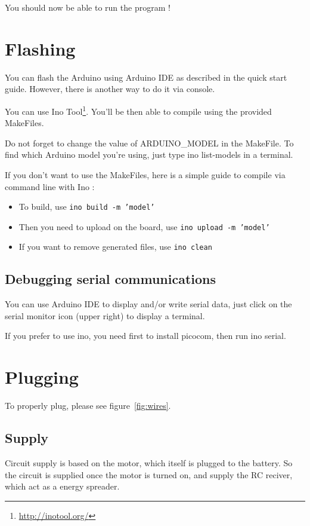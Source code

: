 \documentclass[a4paper,11pt]{report}
\begin{document}
You should now be able to run the program !

\section{Flashing}
\label{sec:Flashing} %

You can flash the Arduino using Arduino IDE as described in the quick start
guide. However, there is another way to do it via console.

You can use Ino Tool\footnote{\url{http://inotool.org/}}. You'll be then able
to compile using the provided MakeFiles.

Do not forget to change the value of ARDUINO\_MODEL in the MakeFile. To find
which Arduino model you're using, just type ino list-models in a terminal.

If you don't want to use the MakeFiles, here is a simple guide to compile via
command line with Ino :
\begin{itemize}
    \item To build, use \texttt{ino build -m 'model'}
    \item Then you need to upload on the board, use \texttt{ino upload -m 'model'}
    \item If you want to remove generated files, use \texttt{ino clean}
\end{itemize}

\subsection{Debugging serial communications}

You can use Arduino IDE to display and/or write serial data, just click on the
serial monitor icon (upper right) to display a terminal.

If you prefer to use ino, you need first to install picocom, then run ino
serial.

\section{Plugging}
To properly plug, please see figure~\ref{fig:wires}.

\subsection{Supply}
Circuit supply is based on the motor, which itself is plugged to the
battery. So the circuit is supplied once the motor is turned on, and supply the
RC reciver, which act as a energy spreader.
\end{document}
